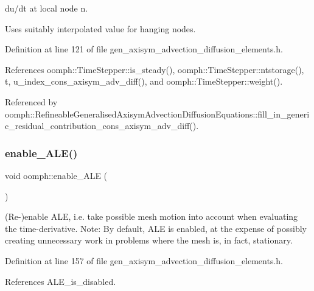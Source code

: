 du/dt at local node n. 

Uses suitably interpolated value for hanging nodes. 

Definition at line 121 of file gen\+\_\+axisym\+\_\+advection\+\_\+diffusion\+\_\+elements.\+h.



References oomph\+::\+Time\+Stepper\+::is\+\_\+steady(), oomph\+::\+Time\+Stepper\+::ntstorage(), t, u\+\_\+index\+\_\+cons\+\_\+axisym\+\_\+adv\+\_\+diff(), and oomph\+::\+Time\+Stepper\+::weight().



Referenced by oomph\+::\+Refineable\+Generalised\+Axisym\+Advection\+Diffusion\+Equations\+::fill\+\_\+in\+\_\+generic\+\_\+residual\+\_\+contribution\+\_\+cons\+\_\+axisym\+\_\+adv\+\_\+diff().

\mbox{\label{namespaceoomph_aad37abf393b70f7aa747525923469a08}} 
\subsubsection{\texorpdfstring{enable\+\_\+\+A\+L\+E()}{enable\_ALE()}}
{\footnotesize\ttfamily void oomph\+::enable\+\_\+\+A\+LE (\begin{DoxyParamCaption}{ }\end{DoxyParamCaption})}



(Re-\/)enable A\+LE, i.\+e. take possible mesh motion into account when evaluating the time-\/derivative. Note\+: By default, A\+LE is enabled, at the expense of possibly creating unnecessary work in problems where the mesh is, in fact, stationary. 



Definition at line 157 of file gen\+\_\+axisym\+\_\+advection\+\_\+diffusion\+\_\+elements.\+h.



References A\+L\+E\+\_\+is\+\_\+disabled.

\mbox{\label{namespaceoomph_a96a6d71e6bedf75a2fb9051be0644f98}} 
